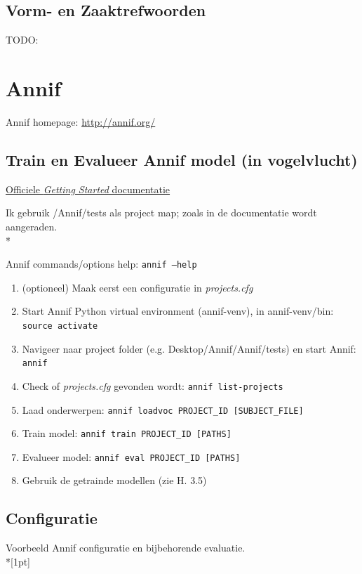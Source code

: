 \documentclass{article}
\begin{document}
\subsection{Vorm- en Zaaktrefwoorden}
TODO:

\section{Annif}

Annif homepage: \url{http://annif.org/}

\subsection{Train en Evalueer Annif model (in vogelvlucht)}

\href{https://github.com/NatLibFi/Annif/wiki/Getting-started}{Officiele \textit{Getting Started} documentatie}

Ik gebruik /Annif/tests als project map; zoals in de documentatie wordt aangeraden.\\*

Annif commands/options help: \texttt{annif --help}

\begin{enumerate}
  \item (optioneel) Maak eerst een configuratie in \textit{projects.cfg}
  \item Start Annif Python virtual environment (annif-venv), in annif-venv/bin: \texttt{source activate}
  \item Navigeer naar project folder (e.g. Desktop/Annif/Annif/tests) en start Annif: \texttt{annif}
  \item Check of \textit{projects.cfg} gevonden wordt: \texttt{annif list-projects}
  \item Laad onderwerpen: \verb|annif loadvoc PROJECT_ID [SUBJECT_FILE]|
  \item Train model: \verb|annif train PROJECT_ID [PATHS]|
  \item Evalueer model: \verb|annif eval PROJECT_ID [PATHS]|
  \item Gebruik de getrainde modellen (zie H. 3.5)
\end{enumerate}


\subsection{Configuratie}

Voorbeeld Annif configuratie en bijbehorende evaluatie.\\*[1pt]
\end{document}
